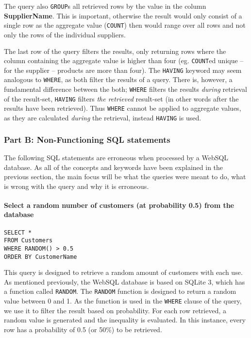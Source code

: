 The query also \texttt{GROUP}s all retrieved rows by the value in the
column \textbf{SupplierName}. This is important, otherwise the result
would only consist of a single row as the aggregate value (\texttt{COUNT})
then would range over all rows and not only the rows of the individual
suppliers.

The last row of the query filters the results, only returning rows
where the column containing the aggregate value is higher than four
(eg. \texttt{COUNT}ed unique -- for the supplier -- products are more
than four). The \texttt{HAVING} keyword may seem analogous to \texttt{WHERE},
as both filter the results of a query. There is, however, a fundamental
difference between the both; \texttt{WHERE} filters the results \textit{during}
retrieval of the result-set, \texttt{HAVING} filters \textit{the retrieved}
result-set (in other words after the results have been retrieved). Thus \texttt{WHERE}
cannot be applied to aggregate values, as they are calculated \textit{during} the
retrieval, instead \texttt{HAVING} is used.

\subsubsection{Part B: Non-Functioning SQL statements}
The following SQL statements are erroneous when processed by a WebSQL database.
As all of the concepts and keywords have been explained in the previous
section, the main focus will be what the queries were meant to do, what is
wrong with the query and why it is erroneous.

\paragraph{Select a random number of customers (at probability 0.5) from the
  database}

\begin{lstlisting}[label={sqlstatement3}]
SELECT *
FROM Customers
WHERE RANDOM() > 0.5
ORDER BY CustomerName
\end{lstlisting}

This query is designed to retrieve a random amount of customers with each
use. As mentioned previously, the WebSQL database is based on SQLite 3,
which has a function called \texttt{RANDOM}. The \texttt{RANDOM} function
is designed to return a random value between 0 and 1. As the function is used
in the \texttt{WHERE} clause of the query, we use it to filter the result
based on probability. For each row retrieved, a random value is generated
and the inequality is evaluated. In this instance, every row has a
probability of 0.5 (or 50\%) to be retrieved.

